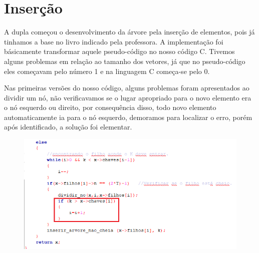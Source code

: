 \section{Inserção}
A dupla começou o desenvolvimento da árvore pela inserção de elementos, pois já tinhamos a base no livro indicado pela professora. A implementação foi básicamente transformar aquele pseudo-código no nosso código C. Tivemos alguns problemas em relação ao tamanho dos vetores, já que no pseudo-código eles começavam pelo número 1 e na linguagem C começa-se pelo 0.
\par Nas primeiras versões do nosso código, alguns problemas foram apresentados ao dividir um nó, não verificavamos se o lugar apropriado para o novo elemento era o nó esquerdo ou direito, por consequência disso, todo novo elemento automaticamente ia para o nó esquerdo, demoramos para localizar o erro, porém após identificado, a solução foi elementar.  

\begin{figure}[!h]
\centering
\includegraphics[width=6in]{relatorio/imagens/imgIfInsercao.png}
\end{figure}